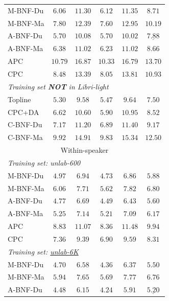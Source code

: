 \documentclass[transmag]{IEEEtran}
\begin{document}
\begin{table}[!t]
{\begin{tabular}{l|cccc|c}
M-BNF-Du & $6.06$&$11.30$&$6.12$&$11.35$&$8.71$ \\
M-BNF-Ma & $7.80$&$12.39$&$7.60$&$12.95$&$10.19$ \\
A-BNF-Du & $\bm{5.70}$&$\bm{10.08}$&$\bm{5.70}$&$\bm{10.02}$&$\underline{\bm{7.88}}$   \\
A-BNF-Ma & $6.38$&$11.02$&$6.23$&$11.02$&$8.66$ \\

APC&  $10.79$&$16.87$&$10.33$&$16.79$ &$13.70$\\
CPC \cite{kahn2019librilight} & $8.48$&$13.39$&$8.05$&$13.81$&$10.93$ \\
\midrule
\multicolumn{6}{l}{\textit{Training set \textbf{NOT} in Libri-light}}\\
Topline & $5.30$&$9.58$&$5.47$&$9.64$&$7.50$\\
CPC+DA \cite{Kharitonov2020data_augment} & $6.62$&$10.60$&$5.90$&$10.95$&$8.52$\\
C-BNF-Du & $7.17$&$11.20$&$6.89$&$11.40$&$9.17$\\
C-BNF-Ma & $9.92$&$14.91$&$9.83$&$15.34$&$12.50$\\
 \midrule
\multicolumn{6}{c}{Within-speaker} \\
\midrule
\multicolumn{6}{l}{\textit{Training set: unlab-600}}\\
M-BNF-Du&  $4.97	$&$6.94$&	$4.73$&	$6.86$&	$5.88$\\
M-BNF-Ma&  $6.06$&	$7.71$&	$5.62$&	$7.82$&	$6.80$\\
A-BNF-Du   & $\bm{4.77}$&	$\bm{6.69}$&	$\bm{4.49}$&	$\bm{6.43}$&	$\bm{5.60}$\\
A-BNF-Ma&  $5.25$&	$7.14$&	$5.21$&	$7.09$&	$6.17$\\
APC&  $8.83$&$11.07$&$8.36$&$11.48$&$9.94$\\
CPC \cite{kahn2019librilight}& $7.36$&	$9.39$&	$6.90$&	$9.59$&	$8.31$\\
\midrule
\multicolumn{6}{l}{\textit{Training set: \underline{unlab-6K}}}\\
M-BNF-Du & $4.70$&$6.58$&$4.36$&$6.37$&$5.50$\\
M-BNF-Ma & $5.94$&$7.65$&$5.69$&$7.77$&$6.76$\\
A-BNF-Du & $\bm{4.48}$&$\bm{6.15}$&$\bm{4.24}$&$\bm{5.91}$&$\underline{\bm{5.20}}$\\

\end{tabular}}
\end{table}
\end{document}
